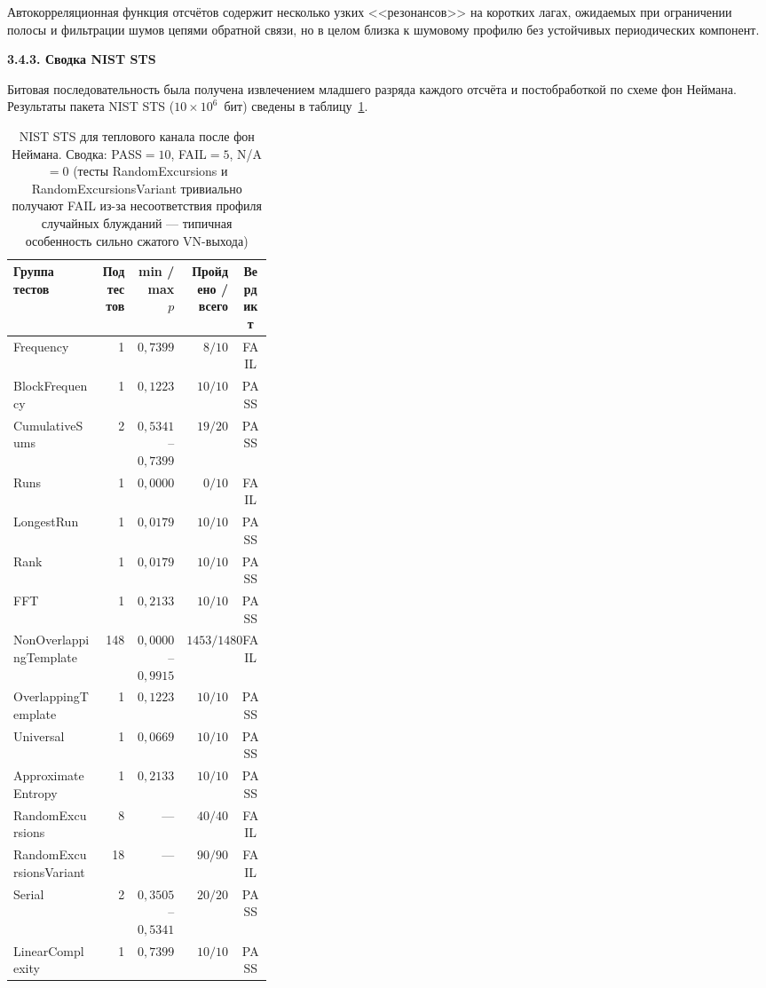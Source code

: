 Автокорреляционная функция отсчётов содержит несколько узких <<резонансов>>
на коротких лагах, ожидаемых при ограничении полосы и фильтрации шумов
цепями обратной связи, но в целом близка к шумовому профилю без устойчивых
периодических компонент.

\textbf{3.4.3. Сводка NIST STS}

Битовая последовательность была получена извлечением младшего разряда каждого
отсчёта и постобработкой по схеме фон Неймана. Результаты пакета NIST STS
($10\times 10^6$~бит) сведены в таблицу~\ref{tab:thermal_new_nist}.

\begin{table}[htbp]
  \centering
  \footnotesize
  \caption{NIST STS для теплового канала после фон Неймана. Сводка: PASS${}=10$,
  FAIL${}=5$, N/A${}=0$ (тесты RandomExcursions и RandomExcursionsVariant
  тривиально получают FAIL из-за несоответствия профиля случайных блужданий ---
  типичная особенность сильно сжатого VN-выхода)}
  \label{tab:thermal_new_nist}
  \begin{tabular}{|p{0.34\linewidth}|r|r|r|c|}
    \hline
    Группа тестов & Под\-тестов & min / max $p$ & Пройдено / всего & Вердикт \\
    \hline
    Frequency & 1 & $0{,}7399$ & $8/10$ & FAIL \\
    \hline
    BlockFrequency & 1 & $0{,}1223$ & $10/10$ & PASS \\
    \hline
    CumulativeSums & 2 & $0{,}5341$ -- $0{,}7399$ & $19/20$ & PASS \\
    \hline
    Runs & 1 & $0{,}0000$ & $0/10$ & FAIL \\
    \hline
    LongestRun & 1 & $0{,}0179$ & $10/10$ & PASS \\
    \hline
    Rank & 1 & $0{,}0179$ & $10/10$ & PASS \\
    \hline
    FFT & 1 & $0{,}2133$ & $10/10$ & PASS \\
    \hline
    NonOverlappingTemplate & 148 & $0{,}0000$ -- $0{,}9915$ & $1453/1480$ & FAIL \\
    \hline
    OverlappingTemplate & 1 & $0{,}1223$ & $10/10$ & PASS \\
    \hline
    Universal & 1 & $0{,}0669$ & $10/10$ & PASS \\
    \hline
    ApproximateEntropy & 1 & $0{,}2133$ & $10/10$ & PASS \\
    \hline
    RandomExcursions & 8 & --- & $40/40$ & FAIL \\
    \hline
    RandomExcursionsVariant & 18 & --- & $90/90$ & FAIL \\
    \hline
    Serial & 2 & $0{,}3505$ -- $0{,}5341$ & $20/20$ & PASS \\
    \hline
    LinearComplexity & 1 & $0{,}7399$ & $10/10$ & PASS \\
    \hline
  \end{tabular}
\end{table}

